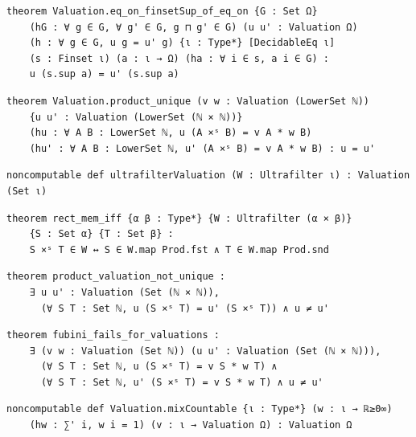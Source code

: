 \label{lean:eq-on-finsetsup-of-eq-on}
\begin{lstlisting}
theorem Valuation.eq_on_finsetSup_of_eq_on {G : Set Ω}
    (hG : ∀ g ∈ G, ∀ g' ∈ G, g ⊓ g' ∈ G) (u u' : Valuation Ω)
    (h : ∀ g ∈ G, u g = u' g) {ι : Type*} [DecidableEq ι]
    (s : Finset ι) (a : ι → Ω) (ha : ∀ i ∈ s, a i ∈ G) :
    u (s.sup a) = u' (s.sup a)
\end{lstlisting}

\label{lean:valuation-product-unique}
\begin{lstlisting}
theorem Valuation.product_unique (v w : Valuation (LowerSet ℕ))
    {u u' : Valuation (LowerSet (ℕ × ℕ))}
    (hu : ∀ A B : LowerSet ℕ, u (A ×ˢ B) = v A * w B)
    (hu' : ∀ A B : LowerSet ℕ, u' (A ×ˢ B) = v A * w B) : u = u'
\end{lstlisting}

\label{lean:ultrafiltervaluation}
\begin{lstlisting}
noncomputable def ultrafilterValuation (W : Ultrafilter ι) : Valuation (Set ι)
\end{lstlisting}

\label{lean:rect-mem-iff}
\begin{lstlisting}
theorem rect_mem_iff {α β : Type*} {W : Ultrafilter (α × β)}
    {S : Set α} {T : Set β} :
    S ×ˢ T ∈ W ↔ S ∈ W.map Prod.fst ∧ T ∈ W.map Prod.snd
\end{lstlisting}

\label{lean:product-valuation-not-unique}
\begin{lstlisting}
theorem product_valuation_not_unique :
    ∃ u u' : Valuation (Set (ℕ × ℕ)),
      (∀ S T : Set ℕ, u (S ×ˢ T) = u' (S ×ˢ T)) ∧ u ≠ u'
\end{lstlisting}

\label{lean:fubini-fails-for-valuations}
\begin{lstlisting}
theorem fubini_fails_for_valuations :
    ∃ (v w : Valuation (Set ℕ)) (u u' : Valuation (Set (ℕ × ℕ))),
      (∀ S T : Set ℕ, u (S ×ˢ T) = v S * w T) ∧
      (∀ S T : Set ℕ, u' (S ×ˢ T) = v S * w T) ∧ u ≠ u'
\end{lstlisting}

\label{lean:mixcountable}
\begin{lstlisting}
noncomputable def Valuation.mixCountable {ι : Type*} (w : ι → ℝ≥0∞)
    (hw : ∑' i, w i = 1) (v : ι → Valuation Ω) : Valuation Ω
\end{lstlisting}


